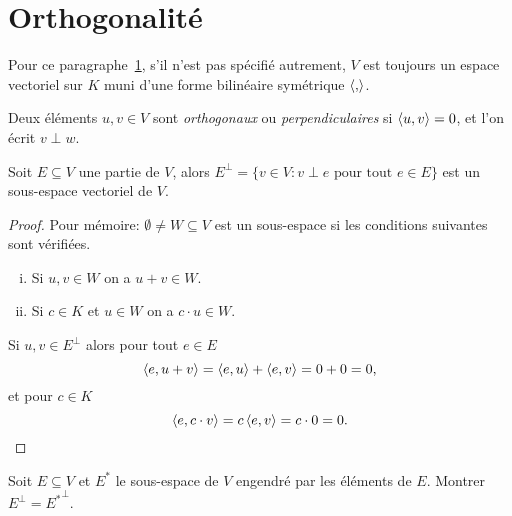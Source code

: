 \section{Orthogonalité} 
\label{sec:orthogonalite}

\begin{framed}\noindent 
  Pour ce paragraphe~\ref{sec:orthogonalite}, s'il n'est pas spécifié autrement,  $V$
  est toujours un espace vectoriel sur $K$
  muni d'une forme bilinéaire symétrique $\langle {,} \rangle$. 
\end{framed}



\begin{definition}
  \label{def:2}
 Deux éléments $u,v \in V$ sont \emph{orthogonaux} ou \emph{perpendiculaires} si $\langle {u,v} \rangle = 0$, et l'on écrit $v \perp w$. 
\end{definition}

\begin{proposition}
  \label{prop:1}
  Soit $E \subseteq V$ une partie de $V$, alors $E^\perp = \{ v \in V \colon v \perp e \text{ pour tout } e \in E \}$   est un sous-espace vectoriel de $V$. 
\end{proposition}

\begin{proof}
  Pour mémoire: $\emptyset \neq W\subseteq V$ est un sous-espace si les conditions suivantes sont vérifiées. 
  \begin{enumerate}[i)]
  \item Si $u,v \in W$ on a $u+v \in W$.  
  \item Si $c \in K$ et $u \in W$ on a $c \cdot u \in W$. 
  \end{enumerate}
  
\noindent 
  Si $u,v \in E^\perp$ alors pour tout $e \in E$ 
  \begin{displaymath}
    \langle {e,u+v} \rangle = \langle {e,u} \rangle + \langle {e,v} \rangle = 0 + 0 = 0,
  \end{displaymath}  
  et pour $c \in K$ 
  \begin{displaymath}
    \langle {e,c\cdot v} \rangle = c \,\langle {e,v} \rangle = c \cdot 0 = 0. 
  \end{displaymath}
\end{proof}



\begin{exercise}
  \label{exe:1}
  Soit $E \subseteq V$ et $E^*$ le sous-espace de $V$ engendré par les éléments de $E$. Montrer $E^\perp = {E^*}^\perp$. 
\end{exercise}


